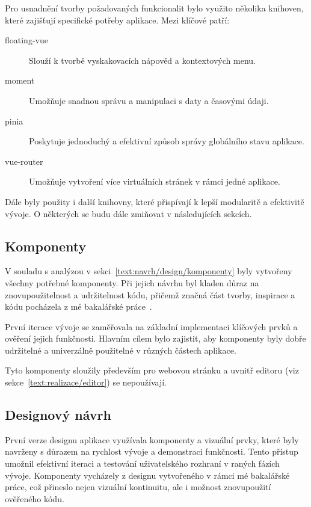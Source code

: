 Pro usnadnění tvorby požadovaných funkcionalit bylo využito několika knihoven, které zajišťují specifické potřeby aplikace. 
Mezi klíčové patří:

\begin{description}
    \item[floating-vue] Slouží k tvorbě vyskakovacích nápověd a kontextových menu.
    \item[moment] Umožňuje snadnou správu a manipulaci s daty a časovými údaji.
    \item[pinia] Poskytuje jednoduchý a efektivní způsob správy globálního stavu aplikace.
    \item[vue-router] Umožňuje vytvoření více virtuálních stránek v rámci jedné aplikace.
\end{description}

Dále byly použity i další knihovny, které přispívají k lepší modularitě a efektivitě vývoje.
O některých se budu dále zmiňovat v následujících sekcích.

\subsection{Komponenty}

V souladu s analýzou v sekci~\ref{text:navrh/design/komponenty} byly vytvořeny všechny potřebné komponenty. 
Při jejich návrhu byl kladen důraz na znovupoužitelnost a udržitelnost kódu, přičemž značná část tvorby, inspirace a kódu pocházela z mé bakalářské práce~\cite{cajthaml_bp}.

První iterace vývoje se zaměřovala na základní implementaci klíčových prvků a ověření jejich funkčnosti. 
Hlavním cílem bylo zajistit, aby komponenty byly dobře udržitelné a univerzálně použitelné v různých částech aplikace.

Tyto komponenty sloužily především pro webovou stránku a uvnitř editoru (viz sekce~\ref{text:realizace/editor}) se nepoužívají.

\subsection{Designový návrh}

První verze designu aplikace využívala komponenty a vizuální prvky, které byly navrženy s důrazem na rychlost vývoje a demonstraci funkčnosti. 
Tento přístup umožnil efektivní iteraci a testování uživatelského rozhraní v raných fázích vývoje.
Komponenty vycházely z designu vytvořeného v rámci mé bakalářské práce, což přineslo nejen vizuální kontinuitu, ale i možnost znovupoužití ověřeného kódu.

